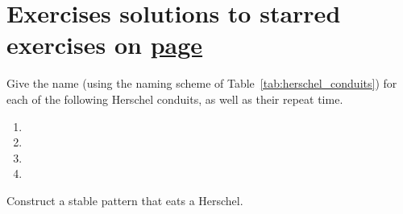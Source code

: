 \section*{Exercises \hfill \normalfont\textsf{\small solutions to starred exercises on \hyperlink{solutions_stable_circuitry}{page \pageref{solutions_stable_circuitry}}}}
\label{sec:stable_exercises}
\vspace*{-0.4cm}\hrulefill\vspace*{-0.3cm}\footnotesize\begin{multicols}{2}\vspace*{-0.4cm}\raggedcolumns{}
	\setlength{\parskip}{0pt}\ifdefined\FORPRINTING{}\else%
\fi
	
	\begin{problemstar}\label{exer:name_conduit} 
		Give the name (using the naming scheme of Table~\ref{tab:herschel_conduits}) for each of the following Herschel conduits, as well as their repeat time.\vspace*{-0.25cm}
		
		\begin{multicols}{2}
			\begin{enumerate}
				\item[\bf\color{ocre}(a)] 
				
				\item[\bf\color{ocre}(c)] 
				
				\item[\bf\color{ocre}(b)] 
				
				\item[\bf\color{ocre}(d)] 
			\end{enumerate}
		\end{multicols}
	\end{problemstar}
	
	
	\mfilbreak
	
	
	\begin{problem}\label{exer:eat_herschel} 
		Construct a stable pattern that eats a Herschel.
		

\end{problem}
\end{multicols}
